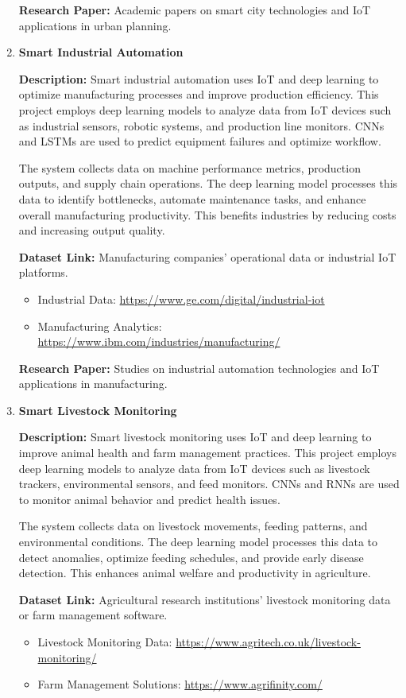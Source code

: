 \documentclass{article}
\begin{document}
\begin{enumerate}[label=\textbf{\arabic*.}, leftmargin=*]
\textbf{Research Paper:} Academic papers on smart city technologies and IoT applications in urban planning.

\item \textbf{Smart Industrial Automation}

\textbf{Description:}
Smart industrial automation uses IoT and deep learning to optimize manufacturing processes and improve production efficiency. This project employs deep learning models to analyze data from IoT devices such as industrial sensors, robotic systems, and production line monitors. CNNs and LSTMs are used to predict equipment failures and optimize workflow.

The system collects data on machine performance metrics, production outputs, and supply chain operations. The deep learning model processes this data to identify bottlenecks, automate maintenance tasks, and enhance overall manufacturing productivity. This benefits industries by reducing costs and increasing output quality.

\textbf{Dataset Link:} Manufacturing companies' operational data or industrial IoT platforms.
\begin{itemize}
    \item Industrial Data: \url{https://www.ge.com/digital/industrial-iot}
    \item Manufacturing Analytics: \url{https://www.ibm.com/industries/manufacturing/}
\end{itemize}

\textbf{Research Paper:} Studies on industrial automation technologies and IoT applications in manufacturing.

\item \textbf{Smart Livestock Monitoring}

\textbf{Description:}
Smart livestock monitoring uses IoT and deep learning to improve animal health and farm management practices. This project employs deep learning models to analyze data from IoT devices such as livestock trackers, environmental sensors, and feed monitors. CNNs and RNNs are used to monitor animal behavior and predict health issues.

The system collects data on livestock movements, feeding patterns, and environmental conditions. The deep learning model processes this data to detect anomalies, optimize feeding schedules, and provide early disease detection. This enhances animal welfare and productivity in agriculture.

\textbf{Dataset Link:} Agricultural research institutions' livestock monitoring data or farm management software.
\begin{itemize}
    \item Livestock Monitoring Data: \url{https://www.agritech.co.uk/livestock-monitoring/}
    \item Farm Management Solutions: \url{https://www.agrifinity.com/}
\end{itemize}


\end{enumerate}
\end{document}
